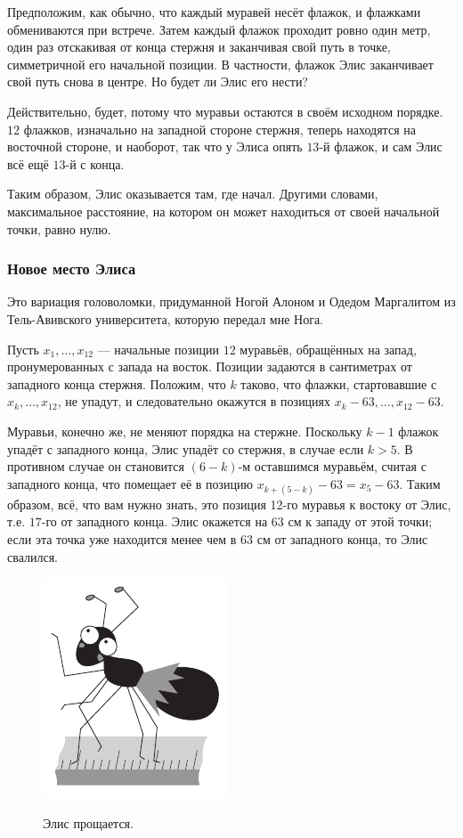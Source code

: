 Предположим, как обычно, что каждый муравей несёт флажок, и флажками обмениваются при встрече.
Затем каждый флажок проходит ровно один метр, один раз отскакивая от конца стержня и заканчивая свой путь в точке, симметричной его начальной позиции.
В частности, флажок Элис заканчивает свой путь снова в центре. Но будет ли Элис его нести?

Действительно, будет, потому что муравьи остаются в своём исходном порядке.
$12$ флажков, изначально на западной стороне стержня, теперь находятся на восточной стороне, и наоборот, так что у Элиса опять $13$-й флажок, и сам Элис всё ещё $13$-й с конца.

Таким образом, Элис оказывается там, где начал.
Другими словами, максимальное расстояние, на котором он может находиться от своей начальной точки, равно нулю.

\subsubsection*{Новое место Элиса}

Это вариация головоломки, придуманной Ногой Алоном и Одедом Маргалитом из Тель-Авивского университета, которую передал мне Нога.

Пусть $x_1,\dots,x_{12}$ --- начальные позиции $12$ муравьёв, обращённых на запад, пронумерованных с запада на восток.
Позиции задаются в сантиметрах от западного конца стержня.
Положим, что $k$ таково, что флажки, стартовавшие с $x_k,\dots,x_{12}$, не упадут, и следовательно окажутся в позициях $x_k-63,\dots,x_{12}-63$.

Муравьи, конечно же, не меняют порядка на стержне.
Поскольку $k-1$ флажок упадёт с западного конца, Элис упадёт со стержня, в случае если $k> 5$.
В противном случае он становится $(6-k)$-м оставшимся муравьём, считая с западного конца, что помещает её в позицию $x_{k+(5-k)}-63=x_5-63$.
Таким образом, всё, что вам нужно знать, это позиция 12-го муравья к востоку от Элис, т.е. $17$-го от западного конца.
Элис окажется на $63$ см к западу от этой точки;
если эта точка уже находится менее чем в $63$ см от западного конца, то Элис свалился.

\begin{figure}[h!]
\centering
\includegraphics[scale=1]{pics/alice2}
\label{pic:alice2}
\caption{Элис прощается.}
\end{figure}
